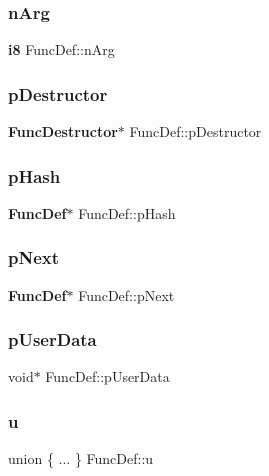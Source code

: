 \mbox{\label{struct_func_def_a65d2af5dc68a0344efb368b8ce1b9141}} 
\subsubsection{nArg}
{\footnotesize\ttfamily \textbf{ i8} Func\+Def\+::n\+Arg}

\mbox{\label{struct_func_def_a1bd12675375b838b5c00b1c79c1e6301}} 
\subsubsection{pDestructor}
{\footnotesize\ttfamily \textbf{ Func\+Destructor}$\ast$ Func\+Def\+::p\+Destructor}

\mbox{\label{struct_func_def_a04561444155a6922d6a2d99a29d35281}} 
\subsubsection{pHash}
{\footnotesize\ttfamily \textbf{ Func\+Def}$\ast$ Func\+Def\+::p\+Hash}

\mbox{\label{struct_func_def_a1ebe547d000172d9ae44d12eeb433a48}} 
\subsubsection{pNext}
{\footnotesize\ttfamily \textbf{ Func\+Def}$\ast$ Func\+Def\+::p\+Next}

\mbox{\label{struct_func_def_a04fdde2f96be198823a483bebcfd3ae3}} 
\subsubsection{pUserData}
{\footnotesize\ttfamily void$\ast$ Func\+Def\+::p\+User\+Data}

\mbox{\label{struct_func_def_a0ed4a95c4ba5c803bfe7adf48888c2dd}} 
\subsubsection{u}
{\footnotesize\ttfamily union \{ ... \}   Func\+Def\+::u}


